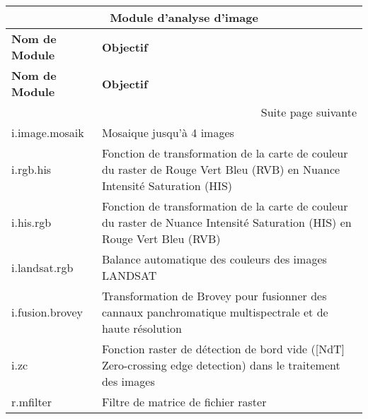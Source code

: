 \begin{center}
{\setlength{\extrarowheight}{10pt}
\small
\begin{longtable}{|p{4cm}|p{10cm}|}
\hline \multicolumn{2}{|c|}{\textbf{Module d'analyse d'image}}\\
\hline \textbf{Nom de Module}&\textbf{Objectif}\\
\endfirsthead
\hline \textbf{Nom de Module}&\textbf{Objectif}\\
\endhead
\hline \multicolumn{2}{|r|}{{Suite page suivante}} \\ \hline
\endfoot
\endlastfoot
  \hline i.image.mosaik & Mosaique jusqu'à 4 images\\
  \hline i.rgb.his & Fonction de transformation de la carte de couleur du raster de Rouge Vert Bleu (RVB) en Nuance Intensité Saturation (HIS)\\
  \hline i.his.rgb & Fonction de transformation de la carte de couleur du raster de Nuance Intensité Saturation (HIS) en Rouge Vert Bleu (RVB) \\
  \hline i.landsat.rgb & Balance automatique des couleurs des images LANDSAT \\
  \hline i.fusion.brovey & Transformation de Brovey pour fusionner des cannaux panchromatique multispectrale et de haute résolution\\
  \hline i.zc & Fonction raster de détection de bord vide ([NdT] Zero-crossing edge detection) dans le traitement des images \\
  \hline r.mfilter &  Filtre de matrice de fichier raster \\

\end{longtable}}
\end{center}
